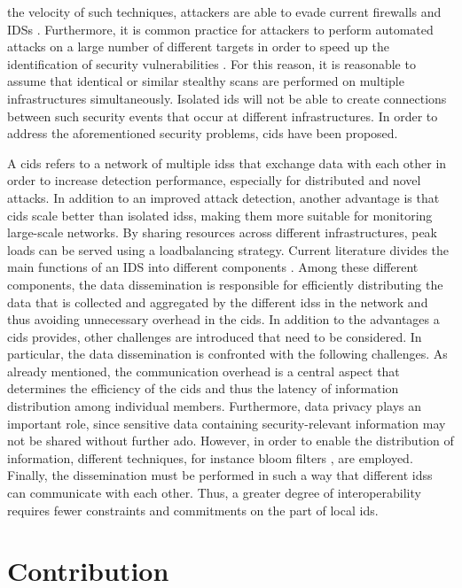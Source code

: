 \documentclass[../../main.tex]{subfiles}
\begin{document}
the velocity of such techniques, attackers are able to evade current firewalls and IDSs \cite{riquet2012large}. Furthermore, it is common practice for attackers to perform automated attacks on a large number of different targets in order to speed up the identification of security vulnerabilities \cite{savage2005}. For this reason, it is reasonable to assume that identical or similar stealthy scans are performed on multiple infrastructures simultaneously. Isolated \gls{ids} will not be able to create connections between such security events that occur at different infrastructures. In order to address the aforementioned security problems, \gls{cids} have been proposed. 

A \gls{cids} refers to a network of multiple \glspl{ids} that exchange data with each other in order to increase detection performance, especially for distributed and novel attacks. In addition to an improved attack detection, another advantage is that \gls{cids} scale better than isolated \glspl{ids}, making them more suitable for monitoring large-scale networks. By sharing resources across different infrastructures, peak loads can be served using a loadbalancing strategy. Current literature divides the main functions of an IDS into different components \cite{vasilomanolakis_collaborative_2016}. Among these different components, the data dissemination is responsible for efficiently distributing the data that is collected and aggregated by the different \glspl{ids} in the network and thus avoiding unnecessary overhead in the \gls{cids}. In addition to the advantages a \gls{cids} provides, other challenges are introduced that need to be considered. In particular, the data dissemination is confronted with the following challenges. As already mentioned, the communication overhead is a central aspect that determines the efficiency of the \gls{cids} and thus the latency of information distribution among individual members. Furthermore, data privacy plays an important role, since sensitive data containing security-relevant information may not be shared without further ado. However, in order to enable the distribution of information, different techniques, for instance bloom filters \cite{Vasilomanolakis2015SkipMon} \cite{Locasto2005}, are employed. Finally, the dissemination must be performed in such a way that different \glspl{ids} can communicate with each other. Thus, a greater degree of interoperability requires fewer constraints and commitments on the part of local \gls{ids}.

\section{Contribution}\label{sec:contribution}
\end{document}
